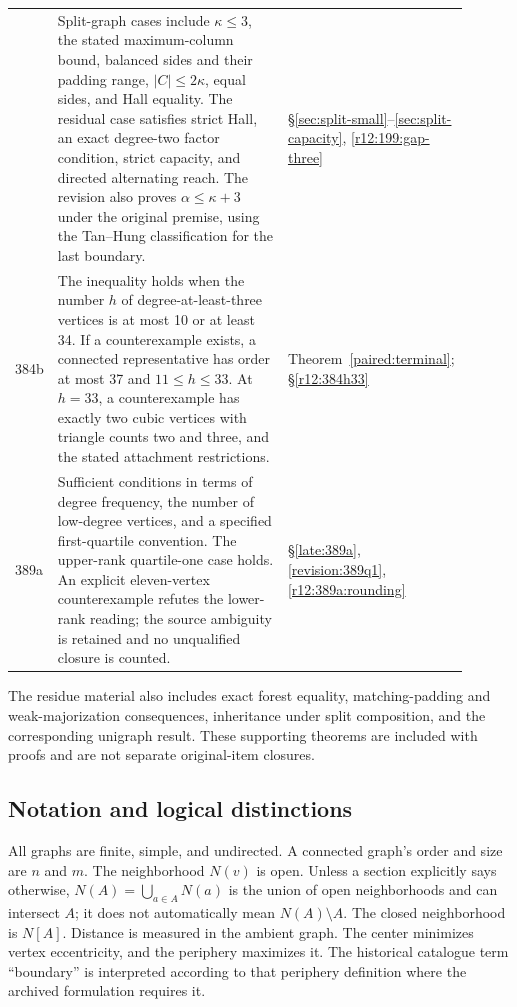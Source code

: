 \documentclass[11pt,a4paper]{article}
\theoremstyle{definition}\newtheorem{definition}[theorem]{Definition}
\theoremstyle{remark}\newtheorem{remark}[theorem]{Remark}
\begin{document}
\begin{longtable}{>{\raggedright\arraybackslash}p{0.075\linewidth}>{\raggedright\arraybackslash}p{0.64\linewidth}>{\raggedright\arraybackslash}p{0.19\linewidth}}
199&Split-graph cases include $\kappa\le3$, the stated maximum-column
bound, balanced sides and their padding range, $|C|\le2\kappa$,
equal sides, and Hall equality. The residual case satisfies strict
Hall, an exact degree-two factor condition, strict capacity, and
directed alternating reach. The revision also proves
$\alpha\le\kappa+3$ under the original premise, using the
Tan--Hung classification for the last boundary.&
\S\ref{sec:split-small}--\ref{sec:split-capacity},
\ref{r12:199:gap-three}\\[5pt]
384b&The inequality holds when the number $h$ of degree-at-least-three
vertices is at most 10 or at least 34. If a counterexample exists,
a connected representative has order at most 37 and $11\le h\le33$.
At $h=33$, a counterexample has exactly two cubic vertices with triangle
counts two and three, and the stated attachment restrictions.&
Theorem~\ref{paired:terminal}; \S\ref{r12:384h33}\\[5pt]
389a&Sufficient conditions in terms of degree frequency, the number
of low-degree vertices, and a specified first-quartile convention.
The upper-rank quartile-one case holds. An explicit eleven-vertex
counterexample refutes the lower-rank reading; the source ambiguity
is retained and no unqualified closure is counted.&
\S\ref{late:389a}, \ref{revision:389q1}, \ref{r12:389a:rounding}\\\bottomrule
\end{longtable}
The residue material also includes exact forest equality, matching-padding
and weak-majorization consequences, inheritance under split composition,
and the corresponding unigraph result. These supporting theorems are
included with proofs and are not separate original-item closures.

\subsection{Notation and logical distinctions}
All graphs are finite, simple, and undirected. A connected graph's
order and size are $n$ and $m$. The neighborhood $N(v)$ is open.
Unless a section explicitly says otherwise, $N(A)=\bigcup_{a\in A}N(a)$
is the union of open neighborhoods and can intersect $A$; it does not
automatically mean $N(A)\setminus A$. The closed neighborhood is $N[A]$.
Distance is measured in the ambient graph. The center minimizes vertex
eccentricity, and the periphery maximizes it. The historical catalogue
term ``boundary'' is interpreted according to that periphery definition
where the archived formulation requires it.
\end{document}
